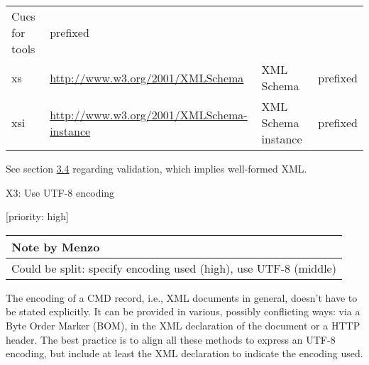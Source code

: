 \documentclass[]{article}
\begin{document}
\begin{longtable}[c]{@{}llll@{}}
\begin{minipage}[t]{0.05\columnwidth}\raggedright\strut
Cues for tools
\strut\end{minipage} &
\begin{minipage}[t]{0.05\columnwidth}\raggedright\strut
prefixed
\strut\end{minipage}\tabularnewline
\begin{minipage}[t]{0.05\columnwidth}\raggedright\strut
xs
\strut\end{minipage} &
\begin{minipage}[t]{0.05\columnwidth}\raggedright\strut
\url{http://www.w3.org/2001/XMLSchema}
\strut\end{minipage} &
\begin{minipage}[t]{0.05\columnwidth}\raggedright\strut
XML Schema
\strut\end{minipage} &
\begin{minipage}[t]{0.05\columnwidth}\raggedright\strut
prefixed
\strut\end{minipage}\tabularnewline
\begin{minipage}[t]{0.05\columnwidth}\raggedright\strut
xsi
\strut\end{minipage} &
\begin{minipage}[t]{0.05\columnwidth}\raggedright\strut
\url{http://www.w3.org/2001/XMLSchema-instance}
\strut\end{minipage} &
\begin{minipage}[t]{0.05\columnwidth}\raggedright\strut
XML Schema instance
\strut\end{minipage} &
\begin{minipage}[t]{0.05\columnwidth}\raggedright\strut
prefixed
\strut\end{minipage}\tabularnewline
\bottomrule
\end{longtable}

See section \href{./Workflow.md}{3.4} regarding validation, which
implies well-formed XML.

X3: Use UTF-8 encoding

{[}priority: high{]}

\begin{longtable}[c]{@{}l@{}}
\toprule
Note by Menzo\tabularnewline
\midrule
\endhead
Could be split: specify encoding used (high), use UTF-8
(middle)\tabularnewline
\bottomrule
\end{longtable}

The encoding of a CMD record, i.e., XML documents in general, doesn't
have to be stated explicitly. It can be provided in various, possibly
conflicting ways: via a Byte Order Marker (BOM), in the XML declaration
of the document or a HTTP header. The best practice is to align all
these methods to express an UTF-8 encoding, but include at least the XML
declaration to indicate the encoding used.
\end{document}
